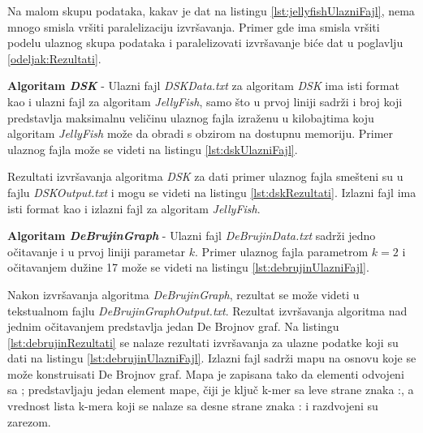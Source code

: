 \documentclass[12pt,oneside]{memoir}
\begin{document}




Na malom skupu podataka, kakav je dat na listingu \ref{lst:jellyfishUlazniFajl}, nema mnogo smisla vršiti paralelizaciju izvršavanja. Primer gde ima smisla vršiti podelu ulaznog skupa podataka i paralelizovati izvršavanje biće dat u poglavlju \ref{odeljak:Rezultati}.

\textbf{Algoritam \textit{DSK}} - Ulazni fajl \textit{DSKData.txt} za algoritam \textit{DSK} ima isti format kao i ulazni fajl za algoritam \textit{JellyFish}, samo što u prvoj liniji sadrži i broj koji predstavlja maksimalnu veličinu ulaznog fajla izraženu u kilobajtima koju algoritam \textit{JellyFish} može da obradi s obzirom na dostupnu memoriju. Primer ulaznog fajla može se videti na listingu \ref{lst:dskUlazniFajl}.



Rezultati izvršavanja algoritma \textit{DSK} za dati primer ulaznog fajla smešteni su u fajlu \textit{DSKOutput.txt} i mogu se videti na listingu \ref{lst:dskRezultati}. Izlazni fajl ima isti format kao i izlazni fajl za algoritam \textit{JellyFish}.



\textbf{Algoritam \textit{DeBrujinGraph}} - Ulazni fajl \textit{DeBrujinData.txt} sadrži jedno očitavanje i u prvoj liniji parametar $k$. Primer ulaznog fajla parametrom $k = 2$ i očitavanjem dužine 17 može se videti na listingu \ref{lst:debrujinUlazniFajl}.



Nakon izvršavanja algoritma \textit{DeBrujinGraph}, rezultat se može videti u tekstualnom fajlu \textit{DeBrujinGraphOutput.txt}. Rezultat izvršavanja algoritma nad jednim očitavanjem predstavlja jedan De Brojnov graf. Na listingu \ref{lst:debrujinRezultati} se nalaze rezultati izvršavanja za ulazne podatke koji su dati na listingu \ref{lst:debrujinUlazniFajl}. Izlazni fajl sadrži mapu na osnovu koje se može konstruisati De Brojnov graf. Mapa je zapisana tako da elementi odvojeni sa ; predstavljaju jedan element mape, čiji je ključ k-mer sa leve strane znaka :, a vrednost lista k-mera koji se nalaze sa
desne strane znaka : i razdvojeni su zarezom.
\end{document}
